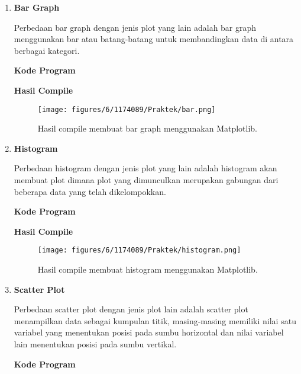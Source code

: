 \begin{enumerate}
	\item \textbf{Bar Graph}
	
	Perbedaan bar graph dengan jenis plot yang lain adalah bar graph menggunakan bar atau batang-batang untuk membandingkan data di antara berbagai kategori.
	
	\textbf{Kode Program}
	
	
	
	\textbf{Hasil Compile}
	
	\begin{figure}[H]
		\texttt{[image: figures/6/1174089/Praktek/bar.png]}
		\centering
		\caption{Hasil compile membuat bar graph menggunakan Matplotlib.}
	\end{figure}
	
	\item \textbf{Histogram}
	
	Perbedaan histogram dengan jenis plot yang lain adalah histogram akan membuat plot dimana plot yang dimunculkan merupakan gabungan dari beberapa data yang telah dikelompokkan.
	
	\textbf{Kode Program}
	
	
	
	\textbf{Hasil Compile}
	
	\begin{figure}[H]
		\texttt{[image: figures/6/1174089/Praktek/histogram.png]}
		\centering
		\caption{Hasil compile membuat histogram menggunakan Matplotlib.}
	\end{figure}
	
	\item \textbf{Scatter Plot}
	
	Perbedaan scatter plot dengan jenis plot lain adalah scatter plot menampilkan data sebagai kumpulan titik, masing-masing memiliki nilai satu variabel yang menentukan posisi pada sumbu horizontal dan nilai variabel lain menentukan posisi pada sumbu vertikal.
	
	\textbf{Kode Program}
	
	
	

\end{enumerate}
